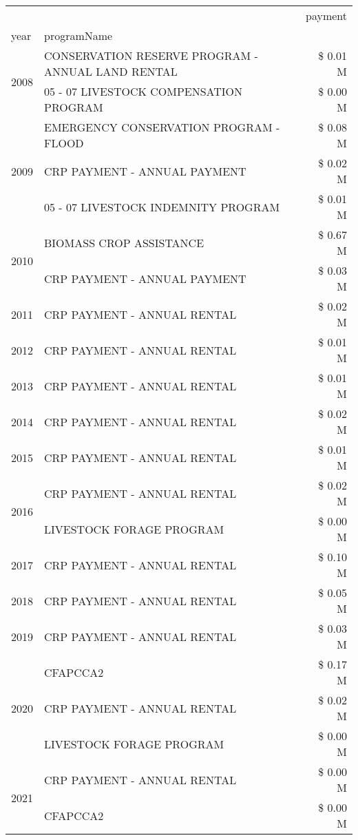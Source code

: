 \begin{tabular}{llr}
\toprule
 &  & payment \\
year & programName &  \\
\midrule
\multirow[t]{2}{*}{2008} & CONSERVATION RESERVE PROGRAM - ANNUAL LAND RENTAL & \$ 0.01 M \\
 & 05 - 07 LIVESTOCK COMPENSATION PROGRAM & \$ 0.00 M \\
\cline{1-3}
\multirow[t]{3}{*}{2009} & EMERGENCY CONSERVATION PROGRAM - FLOOD & \$ 0.08 M \\
 & CRP PAYMENT - ANNUAL PAYMENT & \$ 0.02 M \\
 & 05 - 07 LIVESTOCK INDEMNITY PROGRAM & \$ 0.01 M \\
\cline{1-3}
\multirow[t]{2}{*}{2010} & BIOMASS CROP ASSISTANCE & \$ 0.67 M \\
 & CRP PAYMENT - ANNUAL PAYMENT & \$ 0.03 M \\
\cline{1-3}
2011 & CRP PAYMENT - ANNUAL RENTAL & \$ 0.02 M \\
\cline{1-3}
2012 & CRP PAYMENT - ANNUAL RENTAL & \$ 0.01 M \\
\cline{1-3}
2013 & CRP PAYMENT - ANNUAL RENTAL & \$ 0.01 M \\
\cline{1-3}
2014 & CRP PAYMENT - ANNUAL RENTAL & \$ 0.02 M \\
\cline{1-3}
2015 & CRP PAYMENT - ANNUAL RENTAL & \$ 0.01 M \\
\cline{1-3}
\multirow[t]{2}{*}{2016} & CRP PAYMENT - ANNUAL RENTAL & \$ 0.02 M \\
 & LIVESTOCK FORAGE PROGRAM & \$ 0.00 M \\
\cline{1-3}
2017 & CRP PAYMENT - ANNUAL RENTAL & \$ 0.10 M \\
\cline{1-3}
2018 & CRP PAYMENT - ANNUAL RENTAL & \$ 0.05 M \\
\cline{1-3}
2019 & CRP PAYMENT - ANNUAL RENTAL & \$ 0.03 M \\
\cline{1-3}
\multirow[t]{3}{*}{2020} & CFAPCCA2 & \$ 0.17 M \\
 & CRP PAYMENT - ANNUAL RENTAL & \$ 0.02 M \\
 & LIVESTOCK FORAGE PROGRAM & \$ 0.00 M \\
\cline{1-3}
\multirow[t]{2}{*}{2021} & CRP PAYMENT - ANNUAL RENTAL & \$ 0.00 M \\
 & CFAPCCA2 & \$ 0.00 M \\
\cline{1-3}
\bottomrule
\end{tabular}
